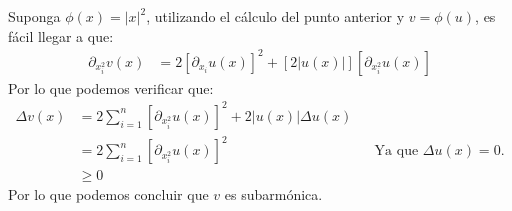 \begin{homeworkProblem}
\begin{enumerate}
\begin{solucion}
        Suponga $\phi(x)=|x|^2$, utilizando el cálculo del punto anterior y $v=\phi(u)$, es fácil llegar a que:
        \begin{align*}
          \partial_{x_i^2}v(x)&=2[\partial_{x_i}u(x)]^2+[2|u(x)|][\partial_{x_i^2}u(x)]
        \end{align*}
        Por lo que podemos verificar que:
        \begin{align*}
          \Delta v(x)&=2\sum_{i=1}^{n}[\partial_{x_i^2}u(x)]^2+2|u(x)|\Delta u(x)\\
          &=2\sum_{i=1}^n[\partial_{x_i^2}u(x)]^2 &&\text{Ya que $\Delta u(x)=0$.}\\
          &\geq 0
        \end{align*}
        Por lo que podemos concluir que $v$ es subarmónica. 
      \end{solucion}
  \end{enumerate}
\end{homeworkProblem}
